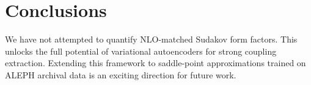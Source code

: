 \section{Conclusions}\label{sec:conclusions}

We have not attempted to quantify NLO-matched Sudakov form factors. This
unlocks the full potential of variational autoencoders for strong
coupling extraction. Extending this framework to saddle-point
approximations trained on ALEPH archival data is an exciting direction
for future work.

